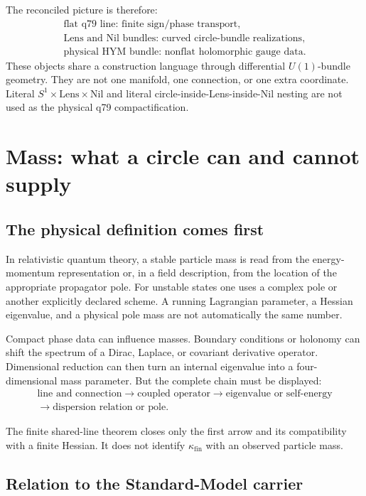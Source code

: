 \documentclass[11pt]{article}
\begin{document}
The reconciled picture is therefore:
\[
\begin{array}{c}
\text{flat q79 line: finite sign/phase transport},\\[2mm]
\text{Lens and Nil bundles: curved circle-bundle realizations},\\[2mm]
\text{physical HYM bundle: nonflat holomorphic gauge data}.
\end{array}
\]
These objects share a construction language through differential
\(U(1)\)-bundle geometry. They are not one manifold, one connection, or one
extra coordinate. Literal \(S^1\times\mathrm{Lens}\times\mathrm{Nil}\) and
literal circle-inside-Lens-inside-Nil nesting are not used as the physical
q79 compactification.

\section{Mass: what a circle can and cannot supply}

\subsection{The physical definition comes first}

In relativistic quantum theory, a stable particle mass is read from the
energy-momentum representation or, in a field description, from the location
of the appropriate propagator pole. For unstable states one uses a complex
pole or another explicitly declared scheme. A running Lagrangian parameter,
a Hessian eigenvalue, and a physical pole mass are not automatically the same
number.

Compact phase data can influence masses. Boundary conditions or holonomy can
shift the spectrum of a Dirac, Laplace, or covariant derivative operator.
Dimensional reduction can then turn an internal eigenvalue into a
four-dimensional mass parameter. But the complete chain must be displayed:
\[
\begin{gathered}
\text{line and connection}
\longrightarrow
\text{coupled operator}
\longrightarrow
\text{eigenvalue or self-energy}\\
\longrightarrow
\text{dispersion relation or pole}.
\end{gathered}
\]

The finite shared-line theorem closes only the first arrow and its
compatibility with a finite Hessian. It does not identify
\(\kappa_{\mathrm{fin}}\) with an observed particle mass.

\subsection{Relation to the Standard-Model carrier}
\end{document}
